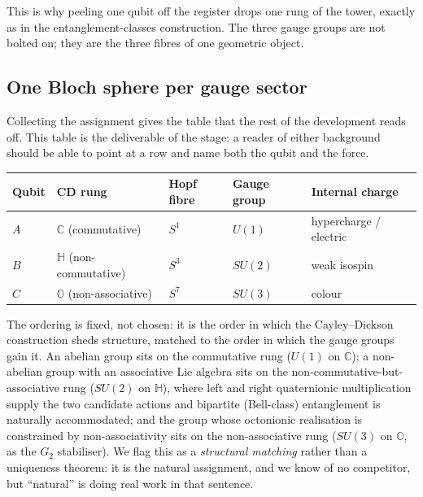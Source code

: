 This is why peeling one qubit off the register drops one rung of the tower, exactly as in the
entanglement-classes construction. The three gauge groups are not bolted on; they are the three
fibres of one geometric object.

\subsection{One Bloch sphere per gauge sector}

Collecting the assignment gives the table that the rest of the development reads off. This table is
the deliverable of the stage: a reader of either background should be able to point at a row and
name both the qubit and the force.

\begin{center}
\begin{tabular}{lllll}
\hline
Qubit & CD rung & Hopf fibre & Gauge group & Internal charge \\
\hline
$A$ & $\mathbb{C}$ (commutative) & $S^1$ & $U(1)$ & hypercharge / electric \\
$B$ & $\mathbb{H}$ (non-commutative) & $S^3$ & $SU(2)$ & weak isospin \\
$C$ & $\mathbb{O}$ (non-associative) & $S^7$ & $SU(3)$ & colour \\
\hline
\end{tabular}
\end{center}

The ordering is fixed, not chosen: it is the order in which the Cayley--Dickson construction
sheds structure, matched to the order in which the gauge groups gain it. An abelian group sits on
the commutative rung ($U(1)$ on $\mathbb{C}$); a non-abelian group with an associative Lie algebra
sits on the non-commutative-but-associative rung ($SU(2)$ on $\mathbb{H}$), where left and right
quaternionic multiplication supply the two candidate actions and bipartite (Bell-class)
entanglement is naturally accommodated; and the group whose octonionic realisation is constrained
by non-associativity sits on the non-associative rung ($SU(3)$ on $\mathbb{O}$, as the $G_2$
stabiliser). We flag this as a \emph{structural matching} rather than a uniqueness theorem: it is
the natural assignment, and we know of no competitor, but ``natural'' is doing real work in that
sentence.

